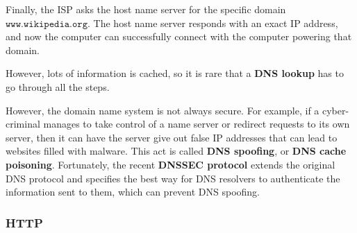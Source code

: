 \documentclass{article}
\begin{document}
\begin{enumerate}
\begin{center}
      \end{center}
      Finally, the ISP asks the host name server for the specific domain $\texttt{www.wikipedia.org}$. The host name server responds with an exact IP address, and now the computer can successfully connect with the computer powering that domain. 
      \begin{center}
      \end{center}
      However, lots of information is cached, so it is rare that a \textbf{DNS lookup} has to go through all the steps. 
  \end{enumerate}

  However, the domain name system is not always secure. For example, if a cyber-criminal manages to take control of a name server or redirect requests to its own server, then it can have the server give out false IP addresses that can lead to websites filled with malware. This act is called \textbf{DNS spoofing}, or \textbf{DNS cache poisoning}. Fortunately, the recent \textbf{DNSSEC protocol} extends the original DNS protocol and specifies the best way for DNS resolvers to authenticate the information sent to them, which can prevent DNS spoofing. 

  \subsubsection{HTTP}
\end{document}
